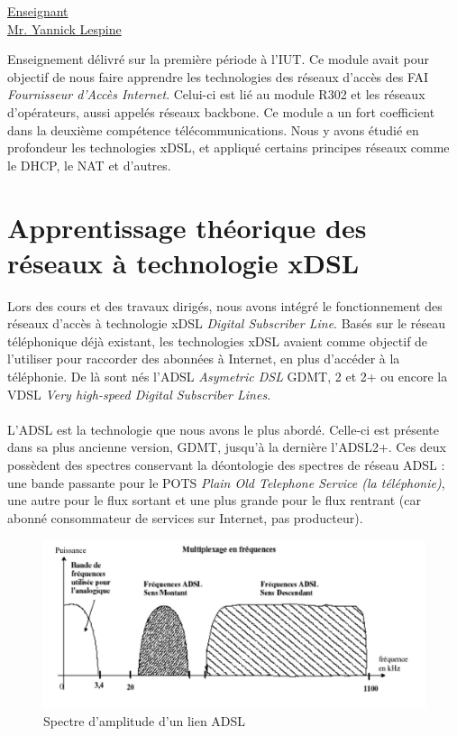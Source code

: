 \renewcommand{\figurename}{}

\vspace*{0.2cm}
      \large
      \href{\@orientadorPagina}{\color{black}Enseignant\\Mr. Yannick Lespine}\\
      \normalsize
\vspace*{0.5cm}

Enseignement délivré sur la première période à l'IUT. Ce module avait pour objectif de nous faire apprendre les technologies des réseaux d'accès des FAI \textit{Fournisseur d'Accès Internet}. Celui-ci est lié au module R302 et les réseaux d'opérateurs, aussi appelés réseaux backbone. Ce module a un fort coefficient dans la deuxième compétence télécommunications. Nous y avons étudié en profondeur les technologies xDSL, et appliqué certains principes réseaux comme le DHCP, le NAT et d'autres.

\section{Apprentissage théorique des réseaux à technologie xDSL}

Lors des cours et des travaux dirigés, nous avons intégré le fonctionnement des réseaux d'accès à technologie xDSL \textit{Digital Subscriber Line}. Basés sur le réseau téléphonique déjà existant, les technologies xDSL avaient comme objectif de l'utiliser pour raccorder des abonnées à Internet, en plus d'accéder à la téléphonie. De là sont nés l'ADSL \textit{Asymetric DSL} GDMT, 2 et 2+ ou encore la VDSL \textit{Very high-speed Digital Subscriber Lines}.
\\ \\
L'ADSL est la technologie que nous avons le plus abordé. Celle-ci est présente dans sa plus ancienne version, GDMT, jusqu'à la dernière l'ADSL2+. Ces deux possèdent des spectres conservant la déontologie des spectres de réseau ADSL : une bande passante pour le POTS \textit{Plain Old Telephone Service (la téléphonie)}, une autre pour le flux sortant et une plus grande pour le flux rentrant (car abonné consommateur de services sur Internet, pas producteur).

\begin{figure}[h]
    \centering
    \includegraphics[width=1\linewidth]{imgs/tmp_adsl.jpg}
    \caption{Spectre d'amplitude d'un lien ADSL}
    \label{fig:tmp_adsl}
\end{figure}


